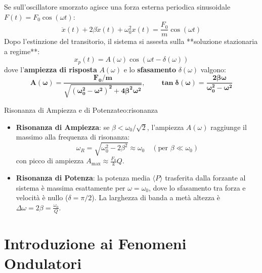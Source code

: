 Se sull'oscillatore smorzato agisce una forza esterna periodica sinusoidale $F(t) = F_0 \cos(\omega t)$:
\begin{equation}
    \ddot{x}(t) + 2\beta\dot{x}(t) + \omega_0^2 x(t) = \frac{F_0}{m}\cos(\omega t)
    \label{eq:edo_forzato}
\end{equation}
Dopo l'estinzione del transitorio, il sistema si assesta sulla **soluzione stazionaria a regime**:
\begin{equation}
    x_p(t) = A(\omega) \cos(\omega t - \delta(\omega))
    \label{eq:stazionaria}
\end{equation}
dove l'\textbf{ampiezza di risposta} $A(\omega)$ e lo \textbf{sfasamento} $\delta(\omega)$ valgono:
\begin{equation}
    \mathbf{A(\omega) = \frac{F_0/m}{\sqrt{(\omega_0^2 - \omega^2)^2 + 4\beta^2\omega^2}}}, \qquad \mathbf{\tan\delta(\omega) = \frac{2\beta\omega}{\omega_0^2 - \omega^2}}
    \label{eq:ampiezza_risonanza}
\end{equation}

\begin{teorema}{Risonanza di Ampiezza e di Potenza}{teo:risonanza}
\begin{itemize}
    \item \textbf{Risonanza di Ampiezza}: se $\beta < \omega_0/\sqrt{2}$, l'ampiezza $A(\omega)$ raggiunge il massimo alla frequenza di risonanza:
    \begin{equation}
        \omega_R = \sqrt{\omega_0^2 - 2\beta^2} \approx \omega_0 \quad (\text{per } \beta \ll \omega_0)
    \end{equation}
    con picco di ampiezza $A_{\max} \approx \frac{F_0}{k} Q$.
    \item \textbf{Risonanza di Potenza}: la potenza media $\langle P \rangle$ trasferita dalla forzante al sistema è massima esattamente per $\omega = \omega_0$, dove lo sfasamento tra forza e velocità è nullo ($\delta = \pi/2$). La larghezza di banda a metà altezza è $\Delta\omega = 2\beta = \frac{\omega_0}{Q}$.
\end{itemize}
\end{teorema}

\section{Introduzione ai Fenomeni Ondulatori}
\label{sec:introduzione_onde}

